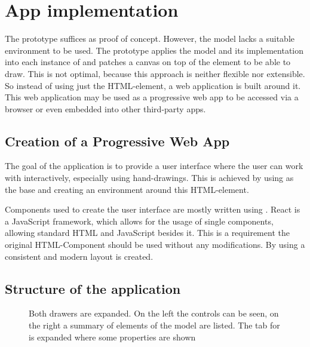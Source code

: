 \section{App implementation}\label{ch:app_implementation}

The prototype suffices as proof of concept.
However, the model lacks a suitable environment to be used.
The prototype applies the model and its implementation into each instance of  and patches a canvas on top of the element to be able to draw.
This is not optimal, because this approach is neither flexible nor extensible.
So instead of using just the  HTML-element, a web application is built around it.
This web application may be used as a progressive web app to be accessed via a browser or even embedded into other third-party apps.

\subsection{Creation of a Progressive Web App}

The goal of the application is to provide a user interface where the user can work with  interactively, especially using hand-drawings.
This is achieved by using  as the base and creating an environment around this HTML-element.

Components used to create the user interface are mostly written using . %
React is a JavaScript framework, which allows for the usage of single components, allowing standard HTML and JavaScript besides it.
This is a requirement the original  HTML-Component should be used without any modifications.
By using \cite{MaterialUI2020} a consistent and modern layout is created.

\subsection{Structure of the application}

\begin{figure}
    \centering
    \caption[Screenshot of the web application]{ Both drawers are expanded. On the left the  controls can be seen, on the right a summary of elements of the model are listed. The tab for  is expanded where some properties are shown }\label{fig:deepmech_klawr_de}
\end{figure}


